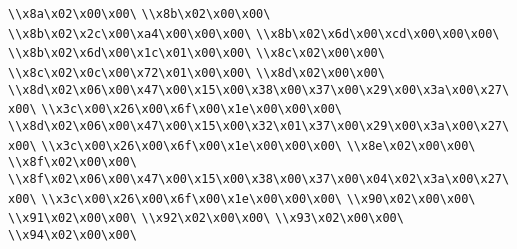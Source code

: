 \verb|\\x8a\x02\x00\x00\|\newline
\verb|\\x8b\x02\x00\x00\|\newline
\verb|\\x8b\x02\x2c\x00\xa4\x00\x00\x00\|\newline
\verb|\\x8b\x02\x6d\x00\xcd\x00\x00\x00\|\newline
\verb|\\x8b\x02\x6d\x00\x1c\x01\x00\x00\|\newline
\verb|\\x8c\x02\x00\x00\|\newline
\verb|\\x8c\x02\x0c\x00\x72\x01\x00\x00\|\newline
\verb|\\x8d\x02\x00\x00\|\newline
\verb|\\x8d\x02\x06\x00\x47\x00\x15\x00\x38\x00\x37\x00\x29\x00\x3a\x00\x27\x00\|\newline
\verb|\\x3c\x00\x26\x00\x6f\x00\x1e\x00\x00\x00\|\newline
\verb|\\x8d\x02\x06\x00\x47\x00\x15\x00\x32\x01\x37\x00\x29\x00\x3a\x00\x27\x00\|\newline
\verb|\\x3c\x00\x26\x00\x6f\x00\x1e\x00\x00\x00\|\newline
\verb|\\x8e\x02\x00\x00\|\newline
\verb|\\x8f\x02\x00\x00\|\newline
\verb|\\x8f\x02\x06\x00\x47\x00\x15\x00\x38\x00\x37\x00\x04\x02\x3a\x00\x27\x00\|\newline
\verb|\\x3c\x00\x26\x00\x6f\x00\x1e\x00\x00\x00\|\newline
\verb|\\x90\x02\x00\x00\|\newline
\verb|\\x91\x02\x00\x00\|\newline
\verb|\\x92\x02\x00\x00\|\newline
\verb|\\x93\x02\x00\x00\|\newline
\verb|\\x94\x02\x00\x00\|\newline
